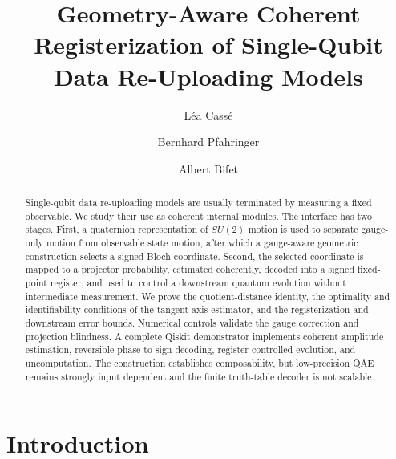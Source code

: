 \documentclass[a4paper,twocolumn,11pt,unpublished]{quantumarticle}
\begin{document}
\title{Geometry-Aware Coherent Registerization of Single-Qubit Data Re-Uploading Models}

\author{L\'ea Cass\'e}

\author{Bernhard Pfahringer}

\author{Albert Bifet}

\maketitle

\begin{abstract}
Single-qubit data re-uploading models are usually terminated by measuring a fixed observable. We study their use as coherent internal modules. The interface has two stages. First, a quaternion representation of $SU(2)$ motion is used to separate gauge-only motion from observable state motion, after which a gauge-aware geometric construction selects a signed Bloch coordinate. Second, the selected coordinate is mapped to a projector probability, estimated coherently, decoded into a signed fixed-point register, and used to control a downstream quantum evolution without intermediate measurement. We prove the quotient-distance identity, the optimality and identifiability conditions of the tangent-axis estimator, and the registerization and downstream error bounds. Numerical controls validate the gauge correction and projection blindness. A complete Qiskit demonstrator implements coherent amplitude estimation, reversible phase-to-sign decoding, register-controlled evolution, and uncomputation. The construction establishes composability, but low-precision QAE remains strongly input dependent and the finite truth-table decoder is not scalable.
\end{abstract}

\section{Introduction}
\end{document}
